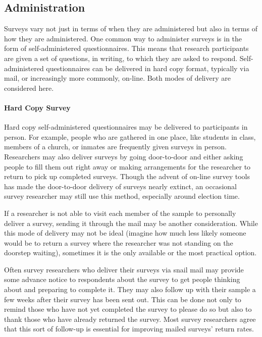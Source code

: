 \subsection{Administration}

Surveys vary not just in terms of when they are administered but also in terms of how they are administered. One common way to administer surveys is in the form of self-administered questionnaires. This means that research participants are given a set of questions, in writing, to which they are asked to respond. Self-administered questionnaires can be delivered in hard copy format, typically via mail, or increasingly more commonly, on-line. Both modes of delivery are considered here.

\paragraph{Hard Copy Survey}

Hard copy self-administered questionnaires may be delivered to participants in person. For example, people who are gathered in one place, like students in class, members of a church, or inmates are frequently given surveys in person. Researchers may also deliver surveys by going door-to-door and either asking people to fill them out right away or making arrangements for the researcher to return to pick up completed surveys. Though the advent of on-line survey tools has made the door-to-door delivery of surveys nearly extinct, an occasional survey researcher may still use this method, especially around election time.

If a researcher is not able to visit each member of the sample to personally deliver a survey, sending it through the mail may be another consideration. While this mode of delivery may not be ideal (imagine how much less likely someone would be to return a survey where the researcher was not standing on the doorstep waiting), sometimes it is the only available or the most practical option.

Often survey researchers who deliver their surveys via snail mail may provide some advance notice to respondents about the survey to get people thinking about and preparing to complete it. They may also follow up with their sample a few weeks after their survey has been sent out. This can be done not only to remind those who have not yet completed the survey to please do so but also to thank those who have already returned the survey. Most survey researchers agree that this sort of follow-up is essential for improving mailed surveys' return rates\cite{babbie2010unobtrusive}.

